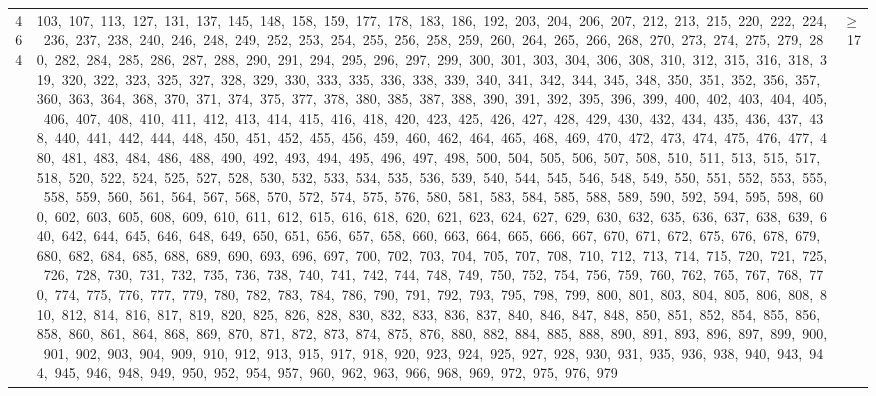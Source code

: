 \begin{longtable}{c|p{}|r}
464 & 103,\ 107,\ 113,\ 127,\ 131,\ 137,\ 145,\ 148,\ 158,\ 159,\ 177,\ 178,\ 183,\ 186,\ 192,\ 203,\ 204,\ 206,\ 207,\ 212,\ 213,\ 215,\ 220,\ 222,\ 224,\ 236,\ 237,\ 238,\ 240,\ 246,\ 248,\ 249,\ 252,\ 253,\ 254,\ 255,\ 256,\ 258,\ 259,\ 260,\ 264,\ 265,\ 266,\ 268,\ 270,\ 273,\ 274,\ 275,\ 279,\ 280,\ 282,\ 284,\ 285,\ 286,\ 287,\ 288,\ 290,\ 291,\ 294,\ 295,\ 296,\ 297,\ 299,\ 300,\ 301,\ 303,\ 304,\ 306,\ 308,\ 310,\ 312,\ 315,\ 316,\ 318,\ 319,\ 320,\ 322,\ 323,\ 325,\ 327,\ 328,\ 329,\ 330,\ 333,\ 335,\ 336,\ 338,\ 339,\ 340,\ 341,\ 342,\ 344,\ 345,\ 348,\ 350,\ 351,\ 352,\ 356,\ 357,\ 360,\ 363,\ 364,\ 368,\ 370,\ 371,\ 374,\ 375,\ 377,\ 378,\ 380,\ 385,\ 387,\ 388,\ 390,\ 391,\ 392,\ 395,\ 396,\ 399,\ 400,\ 402,\ 403,\ 404,\ 405,\ 406,\ 407,\ 408,\ 410,\ 411,\ 412,\ 413,\ 414,\ 415,\ 416,\ 418,\ 420,\ 423,\ 425,\ 426,\ 427,\ 428,\ 429,\ 430,\ 432,\ 434,\ 435,\ 436,\ 437,\ 438,\ 440,\ 441,\ 442,\ 444,\ 448,\ 450,\ 451,\ 452,\ 455,\ 456,\ 459,\ 460,\ 462,\ 464,\ 465,\ 468,\ 469,\ 470,\ 472,\ 473,\ 474,\ 475,\ 476,\ 477,\ 480,\ 481,\ 483,\ 484,\ 486,\ 488,\ 490,\ 492,\ 493,\ 494,\ 495,\ 496,\ 497,\ 498,\ 500,\ 504,\ 505,\ 506,\ 507,\ 508,\ 510,\ 511,\ 513,\ 515,\ 517,\ 518,\ 520,\ 522,\ 524,\ 525,\ 527,\ 528,\ 530,\ 532,\ 533,\ 534,\ 535,\ 536,\ 539,\ 540,\ 544,\ 545,\ 546,\ 548,\ 549,\ 550,\ 551,\ 552,\ 553,\ 555,\ 558,\ 559,\ 560,\ 561,\ 564,\ 567,\ 568,\ 570,\ 572,\ 574,\ 575,\ 576,\ 580,\ 581,\ 583,\ 584,\ 585,\ 588,\ 589,\ 590,\ 592,\ 594,\ 595,\ 598,\ 600,\ 602,\ 603,\ 605,\ 608,\ 609,\ 610,\ 611,\ 612,\ 615,\ 616,\ 618,\ 620,\ 621,\ 623,\ 624,\ 627,\ 629,\ 630,\ 632,\ 635,\ 636,\ 637,\ 638,\ 639,\ 640,\ 642,\ 644,\ 645,\ 646,\ 648,\ 649,\ 650,\ 651,\ 656,\ 657,\ 658,\ 660,\ 663,\ 664,\ 665,\ 666,\ 667,\ 670,\ 671,\ 672,\ 675,\ 676,\ 678,\ 679,\ 680,\ 682,\ 684,\ 685,\ 688,\ 689,\ 690,\ 693,\ 696,\ 697,\ 700,\ 702,\ 703,\ 704,\ 705,\ 707,\ 708,\ 710,\ 712,\ 713,\ 714,\ 715,\ 720,\ 721,\ 725,\ 726,\ 728,\ 730,\ 731,\ 732,\ 735,\ 736,\ 738,\ 740,\ 741,\ 742,\ 744,\ 748,\ 749,\ 750,\ 752,\ 754,\ 756,\ 759,\ 760,\ 762,\ 765,\ 767,\ 768,\ 770,\ 774,\ 775,\ 776,\ 777,\ 779,\ 780,\ 782,\ 783,\ 784,\ 786,\ 790,\ 791,\ 792,\ 793,\ 795,\ 798,\ 799,\ 800,\ 801,\ 803,\ 804,\ 805,\ 806,\ 808,\ 810,\ 812,\ 814,\ 816,\ 817,\ 819,\ 820,\ 825,\ 826,\ 828,\ 830,\ 832,\ 833,\ 836,\ 837,\ 840,\ 846,\ 847,\ 848,\ 850,\ 851,\ 852,\ 854,\ 855,\ 856,\ 858,\ 860,\ 861,\ 864,\ 868,\ 869,\ 870,\ 871,\ 872,\ 873,\ 874,\ 875,\ 876,\ 880,\ 882,\ 884,\ 885,\ 888,\ 890,\ 891,\ 893,\ 896,\ 897,\ 899,\ 900,\ 901,\ 902,\ 903,\ 904,\ 909,\ 910,\ 912,\ 913,\ 915,\ 917,\ 918,\ 920,\ 923,\ 924,\ 925,\ 927,\ 928,\ 930,\ 931,\ 935,\ 936,\ 938,\ 940,\ 943,\ 944,\ 945,\ 946,\ 948,\ 949,\ 950,\ 952,\ 954,\ 957,\ 960,\ 962,\ 963,\ 966,\ 968,\ 969,\ 972,\ 975,\ 976,\ 979 & $\ge$ 17 \\

\end{longtable}
